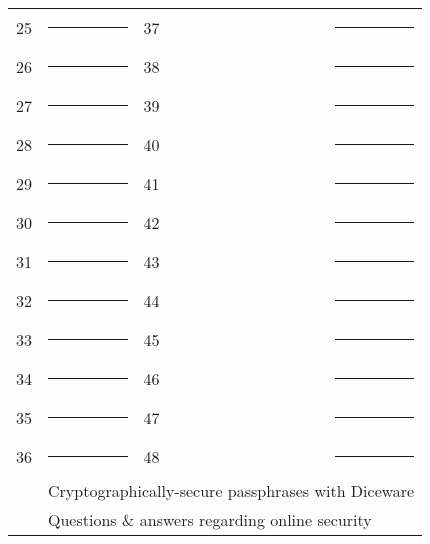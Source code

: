 \begin{center}
	
\begin{tabular}{l l l l }
	25 & \rule{1.75in}{.2pt} & 37 & \rule{1.75in}{.2pt} \vspace{.225in} \\
	26 & \rule{1.75in}{.2pt} & 38 & \rule{1.75in}{.2pt} \vspace{.225in} \\
	27 & \rule{1.75in}{.2pt} & 39 & \rule{1.75in}{.2pt} \vspace{.225in} \\
	28 & \rule{1.75in}{.2pt} & 40 & \rule{1.75in}{.2pt} \vspace{.225in} \\
	29 & \rule{1.75in}{.2pt} & 41 & \rule{1.75in}{.2pt} \vspace{.225in} \\
	30 & \rule{1.75in}{.2pt} & 42 & \rule{1.75in}{.2pt} \vspace{.225in} \\
	31 & \rule{1.75in}{.2pt} & 43 & \rule{1.75in}{.2pt} \vspace{.225in} \\
	32 & \rule{1.75in}{.2pt} & 44 & \rule{1.75in}{.2pt} \vspace{.225in} \\
	33 & \rule{1.75in}{.2pt} & 45 & \rule{1.75in}{.2pt} \vspace{.225in} \\
	34 & \rule{1.75in}{.2pt} & 46 & \rule{1.75in}{.2pt} \vspace{.225in} \\
	35 & \rule{1.75in}{.2pt} & 47 & \rule{1.75in}{.2pt} \vspace{.225in} \\
	36 & \rule{1.75in}{.2pt} & 48 & \rule{1.75in}{.2pt} \vspace{.275in} \\
	\pageref{ch:diceware} & \multicolumn{3}{l}{Cryptographically-secure passphrases with Diceware} \vspace{.275in} \\
	\pageref{ch:qna} & \multicolumn{3}{l}{Questions \& answers regarding online security} \\
\end{tabular}
	
\end{center}
